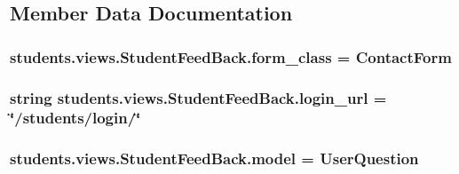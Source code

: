 \subsection{Member Data Documentation}
\hypertarget{classstudents_1_1views_1_1_student_feed_back_a98fa33feb41e0851cda2e65f112d4105}{
\subsubsection[{form\-\_\-class}]{\setlength{\rightskip}{0pt plus 5cm}students.\-views.\-Student\-Feed\-Back.\-form\-\_\-class = Contact\-Form\hspace{0.3cm}{\ttfamily [static]}}}\label{classstudents_1_1views_1_1_student_feed_back_a98fa33feb41e0851cda2e65f112d4105}
\hypertarget{classstudents_1_1views_1_1_student_feed_back_a1252dc07438b7d8230a4f516e7a52af6}{
\subsubsection[{login\-\_\-url}]{\setlength{\rightskip}{0pt plus 5cm}string students.\-views.\-Student\-Feed\-Back.\-login\-\_\-url = \char`\"{}/students/login/\char`\"{}\hspace{0.3cm}{\ttfamily [static]}}}\label{classstudents_1_1views_1_1_student_feed_back_a1252dc07438b7d8230a4f516e7a52af6}
\hypertarget{classstudents_1_1views_1_1_student_feed_back_a94d1baf728a44c115ea4950a0caefbce}{
\subsubsection[{model}]{\setlength{\rightskip}{0pt plus 5cm}students.\-views.\-Student\-Feed\-Back.\-model = User\-Question\hspace{0.3cm}{\ttfamily [static]}}}\label{classstudents_1_1views_1_1_student_feed_back_a94d1baf728a44c115ea4950a0caefbce}
